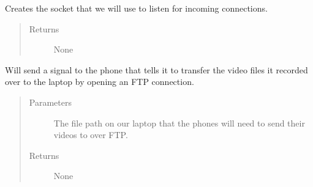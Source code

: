\documentclass[letterpaper,10pt,english]{sphinxmanual}
\begin{document}
\begin{fulllineitems}
\begin{fulllineitems}
\begin{quote}
\begin{description}
\end{description}\end{quote}

\end{fulllineitems}


\begin{fulllineitems}
\label{\detokenize{index:src.Controllers.PhoneController.PhoneControl.setupSocket}}
Creates the socket that we will use to listen for incoming connections.
\begin{quote}\begin{description}
\item[{Returns}] \leavevmode
None

\end{description}\end{quote}

\end{fulllineitems}


\begin{fulllineitems}
\label{\detokenize{index:src.Controllers.PhoneController.PhoneControl.startFileTransfer}}
Will send a signal to the phone that tells it to transfer the video files it recorded over to the laptop
by opening an FTP connection.
\begin{quote}\begin{description}
\item[{Parameters}] \leavevmode
{} \textendash{} The file path on our laptop that the phones will need to send their videos to over FTP.

\item[{Returns}] \leavevmode
None

\end{description}\end{quote}

\end{fulllineitems}


\end{fulllineitems}
\end{document}
